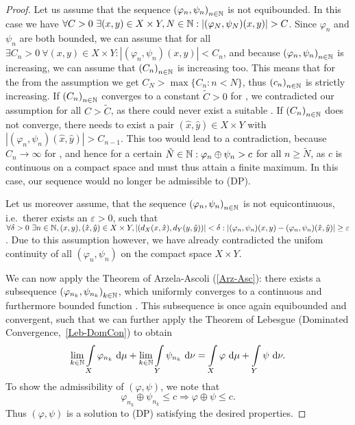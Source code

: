 \begin{proof}
	Let us assume that the sequence ${(\varphi_n, \psi_n)}_{\NinN}$ is not equibounded. In this case we have $\forall C > 0~\exists (x, y) \in X \times Y, \NinN[N]: |(\varphi_N, \psi_N)(x, y)| > C$. Since $\varphi_n$ and $\psi_n$ are both bounded, we can assume that  for all \NinN{} $\exists C_n > 0~\forall (x, y) \in X \times Y: |(\varphi_n, \psi_n)(x, y)| < C_n$, and because ${(\varphi_n, \psi_n)}_{\NinN}$ is increasing, we can assume that ${(C_n)}_{\NinN}$ is increasing too. This means that for the \NinN[N] from the assumption we get $C_N > \max \{C_n : n < N \}$, thus ${(c_n)}_{\NinN}$ is strictly increasing. If ${(C_n)}_{\NinN}$ converges to a constant $\tilde{C} > 0$ for \Ninf{}, we contradicted our assumption for all $C > \tilde{C}$, as there could never exist a suitable \NinN. If ${(C_n)}_{\NinN}$ does not converge, there needs to exist a pair $(\hat{x}, \hat{y}) \in X \times Y$ with $|(\varphi_n, \psi_n)(\hat{x}, \hat{y})| > C_{n - 1}$. This too would lead to a contradiction, because $C_n \rightarrow \infty$ for \Ninf{}, and hence for a certain $\NinN[\tilde{N}]: \varphi_n \oplus \psi_n > c$ for all $n \ge \tilde{N}$, as $c$ is continuous on a compact space and must thus attain a finite maximum. In this case, our sequence would no longer be admissible to (DP).
	
	Let us moreover assume, that the sequence ${(\varphi_n, \psi_n)}_{\NinN}$ is not equicontinuous, i.e.\ therer exists an $\varepsilon > 0$, such that $\forall \delta > 0~\exists \NinN, (x, y), (\hat{x}, \hat{y}) \in X \times Y,|(d_X(x, \hat{x}), d_Y(y, \hat{y}))|< \delta: |(\varphi_n, \psi_n)(x, y) - (\varphi_n, \psi_n)(\hat{x}, \hat{y})| \ge \varepsilon$. Due to this assumption however, we have already contradicted the unifom continuity of all $(\varphi_n, \psi_n)$ on the compact space $X \times Y$.
	
	We can now apply the Theorem of Arzela-Ascoli (\ref{Arz-Asc}): there exists a subsequence ${(\varphi_{n_k}, \psi_{n_k})}_{\NinN[k]}$, which uniformly converges to a continuous and furthermore bounded function . This subsequence is once again equibounded and convergent, such that we can further apply the Theorem of Lebesgue (Dominated Convergence,\ \ref{Leb-DomCon}) to obtain
	\[ \lim\limits_{\NinN[k]} \int\limits_X \varphi_{n_k}~\D + \lim\limits_{\NinN[k]} \int\limits_Y \psi_{n_k}~\D[\nu] = \int\limits_X \varphi~\D + \int\limits_Y \psi~\D[\nu]. \]
	To show the admissibility of $(\varphi, \psi)$, we note that
	\[ \varphi_{n_k} \oplus \psi_{n_k} \le c \Rightarrow \varphi \oplus \psi \le c. \]
	Thus $(\varphi, \psi)$ is a solution to (DP) satisfying the desired properties.
\end{proof}

